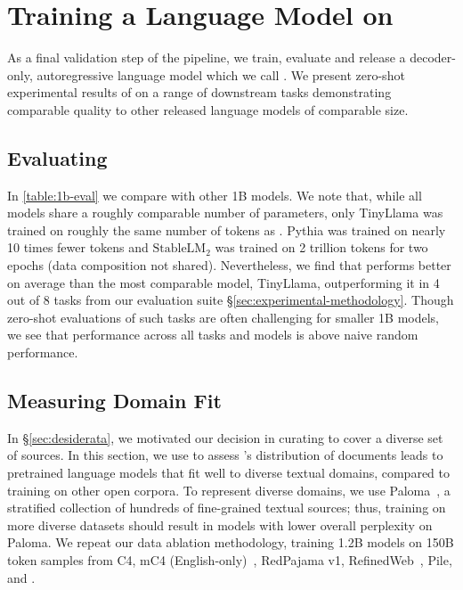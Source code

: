 
\section{Training a Language Model on \dolma}
\label{sec:using}





As a final validation step of the \dolma pipeline, we train, evaluate and release a decoder-only, autoregressive language model which we call \OlmoTiny.  
We present zero-shot experimental results of \OlmoTiny on a range of downstream tasks demonstrating comparable quality to other released language models of comparable size.





\subsection{Evaluating \OlmoTiny}
\label{sec:evaluating-1b}



In \autoref{table:1b-eval} we compare \OlmoTiny with other 1B models. 
We note that, while all models share a roughly comparable number of parameters, only TinyLlama was trained on roughly the same number of tokens as \OlmoTiny.
Pythia was trained on nearly 10 times fewer tokens and 
$\text{StableLM}_2$ was trained on 2 trillion tokens for two epochs (data composition not shared).
Nevertheless, we find that \OlmoTiny performs better on average than the most comparable model, TinyLlama, outperforming it in 4 out of 8 tasks from our evaluation suite \S\ref{sec:experimental-methodology}. 
Though zero-shot evaluations of such tasks are often challenging for smaller 1B models, we see that performance across all tasks and models is above naive random performance.






\subsection{Measuring Domain Fit}
\label{sec:ppl_eval}

In \S\ref{sec:desiderata}, we motivated our decision in curating \dolma to cover a diverse set of sources.
In this section, we use \OlmoTiny to assess \dolma's distribution of documents leads to pretrained language models that fit well to diverse textual domains, compared to training on other open corpora.
To represent diverse domains, we use Paloma~\citep{paloma}, a stratified collection of hundreds of fine-grained textual sources; thus, training on more diverse datasets should result in models with lower overall perplexity on Paloma. 
We repeat our data ablation methodology, training 1.2B models on 150B token samples from C4, mC4 (English-only)~\citep{mc4}, RedPajama v1, RefinedWeb~\citep{falcon40b}, Pile, and \dolma.


